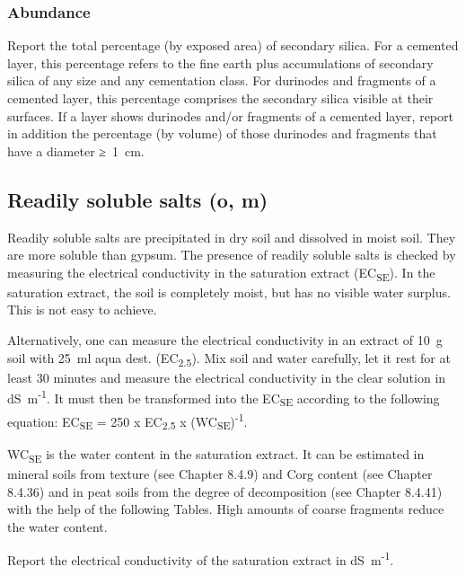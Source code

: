 \documentclass[
  letterpaper,
  DIV=11,
  numbers=noendperiod]{scrreprt}
\begin{document}
\hypertarget{abundance}{%
\subsubsection{Abundance}\label{abundance}}

Report the total percentage (by exposed area) of secondary silica. For a
cemented layer, this percentage refers to the fine earth plus
accumulations of secondary silica of any size and any cementation class.
For durinodes and fragments of a cemented layer, this percentage
comprises the secondary silica visible at their surfaces. If a layer
shows durinodes and/or fragments of a cemented layer, report in addition
the percentage (by volume) of those durinodes and fragments that have a
diameter ≥~1~cm.

\hypertarget{readily-soluble-salts-o-m}{%
\subsection{Readily soluble salts (o,
m)}\label{readily-soluble-salts-o-m}}

Readily soluble salts are precipitated in dry soil and dissolved in
moist soil. They are more soluble than gypsum. The presence of readily
soluble salts is checked by measuring the electrical conductivity in the
saturation extract (EC\textsubscript{SE}). In the saturation extract,
the soil is completely moist, but has no visible water surplus. This is
not easy to achieve.

Alternatively, one can measure the electrical conductivity in an extract
of 10~g soil with 25~ml aqua dest. (EC\textsubscript{2.5}). Mix soil and
water carefully, let it rest for at least 30 minutes and measure the
electrical conductivity in the clear solution in
dS~m\textsuperscript{-1}. It must then be transformed into the
EC\textsubscript{SE} according to the following equation:
EC\textsubscript{SE} = 250 x EC\textsubscript{2.5} x
(WC\textsubscript{SE})\textsuperscript{-1}.

WC\textsubscript{SE} is the water content in the saturation extract. It
can be estimated in mineral soils from texture (see Chapter 8.4.9) and
Corg content (see Chapter 8.4.36) and in peat soils from the degree of
decomposition (see Chapter 8.4.41) with the help of the following
Tables. High amounts of coarse fragments reduce the water content.

Report the electrical conductivity of the saturation extract in
dS~m\textsuperscript{-1}.
\end{document}
